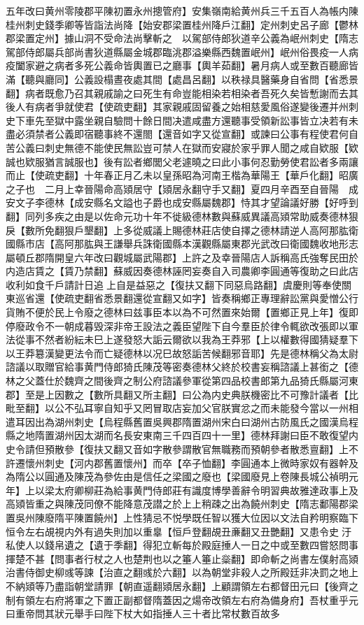 五年改曰黄州零陵郡平陳初置永州摠管府】安集嶺南給黄州兵三千五百人為帳内陳桂州刺史錢季卿等皆詣法尚降【始安郡梁置桂州降戶江翻】定州刺史呂子廊【鬱林郡梁置定州】據山洞不受命法尚擊斬之　以駕部侍郎狄道辛公義為岷州刺史【隋志駕部侍郎屬兵部尚書狄道縣屬金城郡臨洮郡溢樂縣西魏置岷州】岷州俗畏疫一人病疫闔家避之病者多死公義命皆輿置已之廳事【輿羊茹翻】暑月病人或至數百聽廊皆滿【聽與廳同】公義設榻晝夜處其間【處昌呂翻】以秩禄具醫藥身自省問【省悉景翻】病者既愈乃召其親戚諭之曰死生有命豈能相染若相染者吾死久矣皆慙謝而去其後人有病者爭就使君【使疏吏翻】其家親戚固留養之始相慈愛風俗遂變後遷并州刺史下車先至獄中露坐親自驗問十餘日間决遣咸盡方還聽事受領新訟事皆立决若有未盡必須禁者公義即宿聽事終不還閤【還音如字又從宣翻】或諫曰公事有程使君何自苦公義曰刺史無德不能使民無訟豈可禁人在獄而安寢於家乎罪人聞之咸自欵服【欵誠也欵服猶言誠服也】後有訟者鄉閭父老遽曉之曰此小事何忍勤勞使君訟者多兩讓而止【使疏吏翻】十年春正月乙未以皇孫昭為河南王楷為華陽王【華戶化翻】昭廣之子也　二月上幸晉陽命高熲居守【熲居永翻守手又翻】夏四月辛酉至自晉陽　成安文子李德林【成安縣名文謚也子爵也成安縣屬魏郡】恃其才望論議好勝【好呼到翻】同列多疾之由是以佐命元功十年不徙級德林數與蘇威異議高熲常助威奏德林狠戾【數所免翻狠戶墾翻】上多從威議上賜德林莊店使自擇之德林請逆人高阿那肱衛國縣市店【高阿那肱與王謙舉兵誅衛國縣本漢觀縣屬東郡光武改曰衛國魏收地形志屬頓丘郡隋開皇六年改曰觀城屬武陽郡】上許之及幸晉陽店人訴稱高氏強奪民田於内造店賃之【賃乃禁翻】蘇威因奏德林誣罔妄奏自入司農卿李圓通等復助之曰此店收利如食千戶請計日追上自是益惡之【復扶又翻下同惡烏路翻】虞慶則等奉使關東巡省還【使疏吏翻省悉景翻還從宣翻又如字】皆奏稱鄉正專理辭訟黨與愛憎公行貨賄不便於民上令廢之德林曰兹事臣本以為不可然置來始爾【置鄉正見上年】復即停廢政令不一朝成暮毁深非帝王設法之義臣望陛下自今羣臣於律令輒欲改張即以軍法從事不然者紛紜未巳上遂發怒大詬云爾欲以我為王莽邪【上以權數得國猜疑羣下以王莽簒漢變更法令而亡疑德林以况巳故怒詬苦候翻邪音耶】先是德林稱父為太尉諮議以取贈官給事黄門侍郎猗氏陳茂等密奏德林父終於校書妄稱諮議上甚銜之【德林之父蓋仕於魏齊之間後齊之制公府諮議參軍從第四品校書郎第九品猗氏縣屬河東郡】至是上因數之【數所具翻又所主翻】曰公為内史典朕機密比不可豫計議者【比毗至翻】以公不弘耳寧自知乎又罔冒取店妄加父官朕實忿之而未能發今當以一州相遣耳因出為湖州刺史【烏程縣舊置吳興郡隋置湖州宋白曰湖州古防風氏之國漢烏程縣之地隋置湖州因太湖而名長安東南三千四百四十一里】德林拜謝曰臣不敢復望内史令請但預散參【復扶又翻又音如字散參謂散官無職務而預朝參者散悉亶翻】上不許遷懷州刺史【河内郡舊置懷州】而卒【卒子恤翻】李圓通本上微時家奴有器幹及為隋公以圓通及陳茂為參佐由是信任之梁國之廢也【梁國廢見上卷陳長城公禎明元年】上以梁太府卿柳莊為給事黄門侍郎莊有識度博學善辭令明習典故雅達政事上及高熲皆重之與陳茂同僚不能降意茂譛之於上上稍疎之出為饒州刺史【隋志鄱陽郡梁置吳州陳廢隋平陳置饒州】上性猜忌不悦學既任智以獲大位因以文法自矜明察臨下恒令左右覘視内外有過失則加以重辠【恒戶登翻覘丑亷翻又丑艷翻】又患令史汙私使人以錢帛遺之【遺于季翻】得犯立斬每於殿庭捶人一日之中或至數四嘗怒問事揮楚不甚【問事者行杖之人也楚荆也以之箠人箠止橤翻】即命斬之尚書左僕射高熲治書侍御史柳彧等諫【治直之翻彧於六翻】以為朝堂非殺人之所殿廷非决罰之地上不納熲等乃盡詣朝堂請罪【朝直遥翻熲居永翻】上顧謂領左右都督田元曰【後齊之制有領左右府將軍之下置正副都督隋蓋因之煬帝改領左右府為備身府】吾杖重乎元曰重帝問其狀元舉手曰陛下杖大如指捶人三十者比常杖數百故多